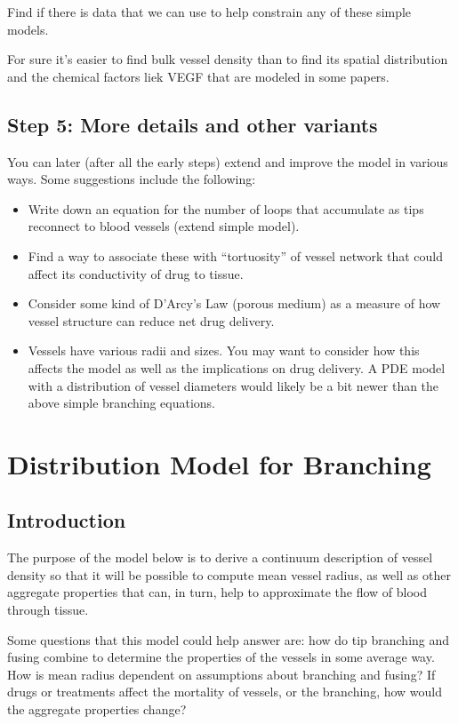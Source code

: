 Find if there is data that we can use to help constrain any of these simple models.

For sure it's easier to find bulk vessel density than to find its spatial distribution and the chemical factors liek VEGF that are modeled in some papers.


\subsection{Step 5: More details and other variants}

You can later (after all the early steps) extend and improve the model in various ways. Some suggestions include the following:

\begin{itemize}
	\item Write down an equation for the number of loops that accumulate as tips reconnect to blood vessels (extend simple model).
	\item Find a way to associate these with ``tortuosity'' of vessel network that could affect its conductivity of drug to tissue.
	\item Consider some kind of D'Arcy's Law (porous medium) as a measure of how vessel structure can reduce net drug delivery.
	\item Vessels have various radii and sizes. You may want to consider how this affects the model as well as the implications on drug delivery. A PDE model with a distribution of vessel diameters would likely be a bit newer than the above simple branching equations.
\end{itemize}



\section{Distribution Model for Branching}

%	
\subsection{Introduction}

The purpose of the model below is to derive a continuum description of vessel density so that it will be possible to compute mean vessel radius, as well as other aggregate properties that can, in turn, help to approximate the flow of blood through tissue.

Some questions that this model could help answer are: how do tip branching and fusing combine to determine the properties of the vessels in some average way. How is mean radius dependent on assumptions about branching and fusing? If drugs or treatments affect the mortality of vessels, or the branching, how would the aggregate properties change?


